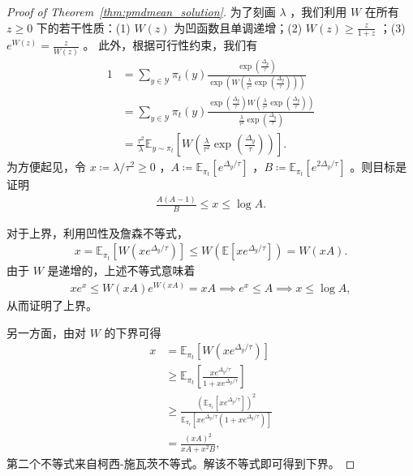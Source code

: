 \documentclass{article}
\theoremstyle{plain}
\theoremstyle{definition}
\theoremstyle{remark}
\newcommand{\cW}{W}
\begin{document}
\begin{proof}[Proof of Theorem~\ref{thm:pmdmean_solution}]
    为了刻画 $\lambda$ ，我们利用 $W$ 在所有 $z\geq 0$ 下的若干性质：(1) $\cW(z)$ 为凹函数且单调递增；(2) $\cW(z)\geq\frac{z}{1+z}$ ；(3) $e^{\cW(z)}=\frac{z}{\cW(z)}$ 。  
此外，根据可行性约束，我们有 
    \begin{align*}
        1
        &=\sum_{y\in\mathcal{Y}}\pi_t(y)\frac{\exp\left(\frac{\Delta_y}{\tau}\right)}{\exp\left(W\left( \frac{\lambda}{\tau^2} \exp\left(\frac{\Delta_y}{\tau}\right)\right)\right)}\\
        &=\sum_{y\in\mathcal{Y}}\pi_t(y)\frac{\exp\left(\frac{\Delta_y}{\tau}\right)W\left(\frac{\lambda}{\tau^2} \exp\left(\frac{\Delta_y}{\tau}\right)\right)}{\frac{\lambda}{\tau^2} \exp\left(\frac{\Delta_y}{\tau}\right)}\\
        &=\frac{\tau^2}{\lambda}\mathbb{E}_{y\sim\pi_t}\left[W\left(\frac{\lambda}{\tau^2} \exp\left(\frac{\Delta_y}{\tau}\right)\right)\right].
    \end{align*}
    为方便起见，令 $x\coloneqq\lambda/\tau^2\geq 0$ ，$A\coloneqq\mathbb{E}_{\pi_t}[e^{\Delta_y/\tau}]$ ，$B\coloneqq\mathbb{E}_{\pi_t}[e^{2\Delta_y/\tau}]$ 。则目标是证明 
    \begin{align*}
        \frac{A(A-1)}{B}\leq x\leq\log A.
    \end{align*}

    对于上界，利用凹性及詹森不等式， 
    \begin{align*}
        x=\mathbb{E}_{\pi_t}[\cW(xe^{\Delta_y/\tau})]
        \leq \cW(\mathbb{E}[xe^{\Delta_y/\tau}])
        =\cW(xA).
    \end{align*}
    由于 $W$ 是递增的，上述不等式意味着 
    \begin{align*}
        xe^x\leq \cW(xA)e^{\cW(xA)}=xA\implies e^x\leq A\implies x\leq\log A,
    \end{align*}
    从而证明了上界。

   另一方面，由对 $\cW$ 的下界可得 
    \begin{align*}
        x&=\mathbb{E}_{\pi_t}[\cW(xe^{\Delta_y/\tau})]\\
        &\geq\mathbb{E}_{\pi_t}\left[\frac{xe^{\Delta_y/\tau}}{1+xe^{\Delta_y/\tau}}\right]\\
        &\geq
        \frac{\left(\mathbb{E}_{\pi_t}[xe^{\Delta_y/\tau}]\right)^2}{\mathbb{E}_{\pi_t}[xe^{\Delta_y/\tau}(1+xe^{\Delta_y/\tau})]}\\
        &=\frac{(xA)^2}{xA+x^2B},
    \end{align*}
    第二个不等式来自柯西-施瓦茨不等式。解该不等式即可得到下界。


\end{proof}
\end{document}
